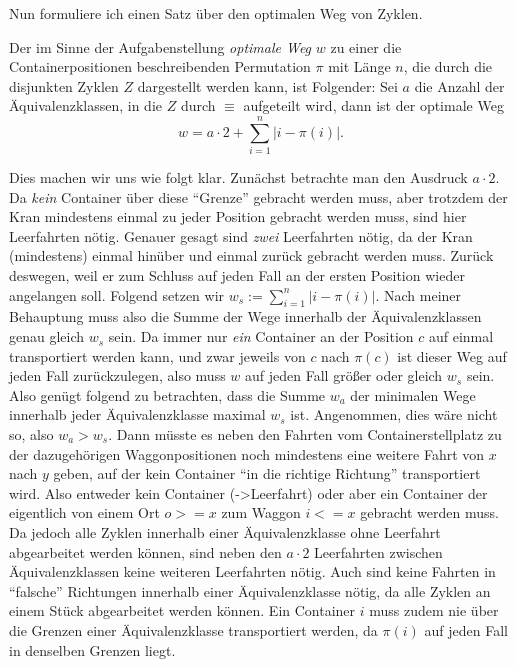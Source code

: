 Nun formuliere ich einen Satz über den optimalen Weg von Zyklen.
\begin{center}
\begin{minipage}[c]{.8\textwidth}
 Der im Sinne der Aufgabenstellung \emph{optimale Weg} $w$ zu einer die Containerpositionen beschreibenden Permutation $\pi$ mit Länge $n$,
  die durch die disjunkten Zyklen $Z$ dargestellt werden kann, ist Folgender:
 Sei $a$ die Anzahl der Äquivalenzklassen, in die $Z$ durch $\equiv$ aufgeteilt wird, dann ist der optimale Weg
 \[w = a \cdot 2 + \sum_{i = 1}^{n}{\lvert i-\pi(i)\rvert}. \]
\end{minipage}
\end{center}
Dies machen wir uns wie folgt klar. Zunächst betrachte man den Ausdruck $a \cdot 2$.
Da \emph{kein} Container über diese ``Grenze'' gebracht werden muss, aber trotzdem der Kran mindestens einmal zu jeder Position gebracht werden muss, sind hier Leerfahrten nötig.
Genauer gesagt sind \emph{zwei} Leerfahrten nötig, da der Kran (mindestens) einmal hinüber und einmal zurück gebracht werden muss.
Zurück deswegen, weil er zum Schluss auf jeden Fall an der ersten Position wieder angelangen soll.
Folgend setzen wir $w_s := \sum_{i = 1}^{n}{\lvert i-\pi(i)\rvert}$.
Nach meiner Behauptung muss also die Summe der Wege innerhalb der Äquivalenzklassen genau gleich $w_s$ sein.
Da immer nur \emph{ein} Container an der Position $c$ auf einmal transportiert werden kann,
und zwar jeweils von $c$ nach $\pi(c)$ ist dieser Weg auf jeden Fall zurückzulegen, also muss $w$ auf jeden Fall größer oder gleich $w_s$ sein.
Also genügt folgend zu betrachten, dass die Summe $w_a$ der minimalen Wege innerhalb jeder Äquivalenzklasse maximal $w_s$ ist.
Angenommen, dies wäre nicht so, also $w_a > w_s$.
Dann müsste es neben den Fahrten vom Containerstellplatz zu der dazugehörigen Waggonpositionen noch mindestens eine weitere Fahrt von $x$ nach $y$ geben,
auf der kein Container ``in die richtige Richtung'' transportiert wird.
Also entweder kein Container (->Leerfahrt) oder aber ein Container der eigentlich von einem Ort $o >= x$ zum Waggon $i <= x$ gebracht werden muss.
Da jedoch alle Zyklen innerhalb einer Äquivalenzklasse ohne Leerfahrt abgearbeitet werden können,
sind neben den $a \cdot 2$ Leerfahrten zwischen Äquivalenzklassen keine weiteren Leerfahrten nötig.
Auch sind keine Fahrten in ``falsche'' Richtungen innerhalb einer Äquivalenzklasse nötig, da alle Zyklen an einem Stück abgearbeitet werden können.
Ein Container $i$ muss zudem nie über die Grenzen einer Äquivalenzklasse transportiert werden, da $\pi(i)$ auf jeden Fall in denselben Grenzen liegt.

